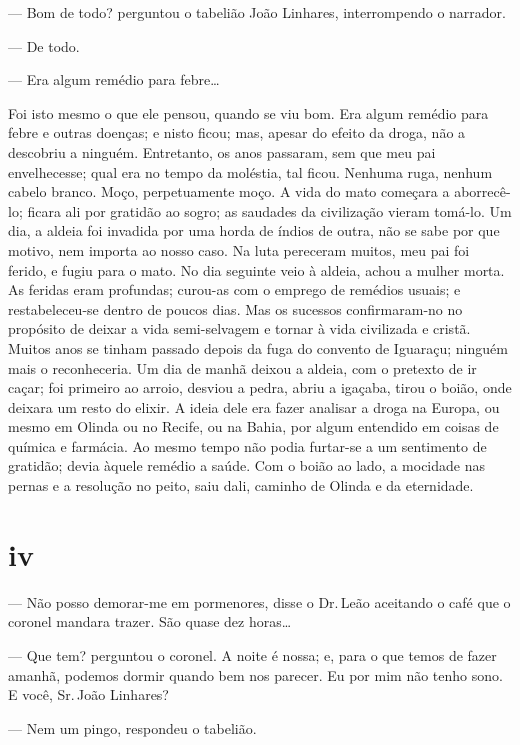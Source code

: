 --- Bom de todo? perguntou o tabelião João Linhares, interrompendo o
narrador.

--- De todo.

--- Era algum remédio para febre\ldots{}

Foi isto mesmo o que ele pensou, quando se viu bom. Era algum remédio
para febre e outras doenças; e nisto ficou; mas, apesar do efeito da
droga, não a descobriu a ninguém. Entretanto, os anos passaram, sem que
meu pai envelhecesse; qual era no tempo da moléstia, tal ficou. Nenhuma
ruga, nenhum cabelo branco. Moço, perpetuamente moço. A vida do mato
começara a aborrecê-lo; ficara ali por gratidão ao sogro; as saudades da
civilização vieram tomá-lo. Um dia, a aldeia foi invadida por uma horda
de índios de outra, não se sabe por que motivo, nem importa ao nosso
caso. Na luta pereceram muitos, meu pai foi ferido, e fugiu para o mato.
No dia seguinte veio à aldeia, achou a mulher morta. As feridas eram
profundas; curou-as com o emprego de remédios usuais; e restabeleceu-se
dentro de poucos dias. Mas os sucessos confirmaram-no no propósito de
deixar a vida semi-selvagem e tornar à vida civilizada e cristã. Muitos
anos se tinham passado depois da fuga do convento de Iguaraçu; ninguém
mais o reconheceria. Um dia de manhã deixou a aldeia, com o pretexto de
ir caçar; foi primeiro ao arroio, desviou a pedra, abriu a igaçaba,
tirou o boião, onde deixara um resto do elixir. A ideia dele era fazer
analisar a droga na Europa, ou mesmo em Olinda ou no Recife, ou na
Bahia, por algum entendido em coisas de química e farmácia. Ao mesmo
tempo não podia furtar-se a um sentimento de gratidão; devia àquele
remédio a saúde. Com o boião ao lado, a mocidade nas pernas e a
resolução no peito, saiu dali, caminho de Olinda e da eternidade.





\section*{iv}



--- Não posso demorar-me em pormenores, disse o Dr.\,Leão aceitando o
café que o coronel mandara trazer. São quase dez horas\ldots{}

--- Que tem? perguntou o coronel. A noite é nossa; e, para o que temos
de fazer amanhã, podemos dormir quando bem nos parecer. Eu por mim não
tenho sono. E você, Sr.\,João Linhares?

--- Nem um pingo, respondeu o tabelião.

